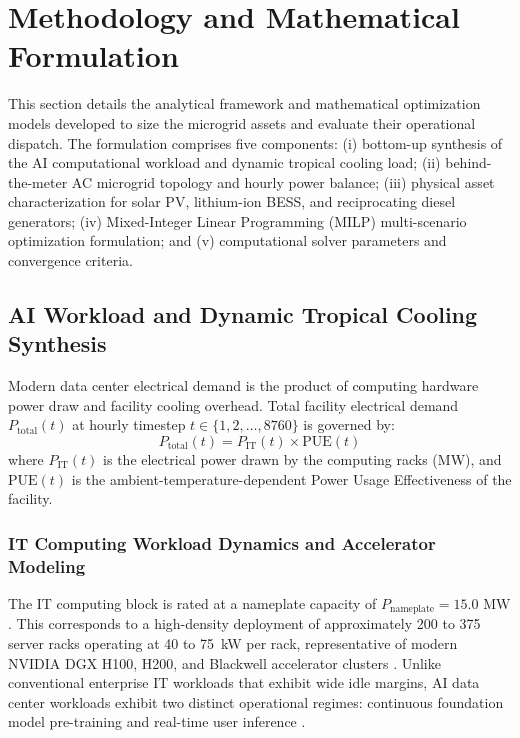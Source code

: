 \documentclass[11pt,a4paper]{article}
\begin{document}
\section{Methodology and Mathematical Formulation}
\label{sec:method}

This section details the analytical framework and mathematical optimization models developed to size the microgrid assets and evaluate their operational dispatch. The formulation comprises five components: (i) bottom-up synthesis of the AI computational workload and dynamic tropical cooling load; (ii) behind-the-meter AC microgrid topology and hourly power balance; (iii) physical asset characterization for solar PV, lithium-ion BESS, and reciprocating diesel generators; (iv) Mixed-Integer Linear Programming (MILP) multi-scenario optimization formulation; and (v) computational solver parameters and convergence criteria.

\subsection{AI Workload and Dynamic Tropical Cooling Synthesis}
\label{sec:load_cooling_model}

Modern data center electrical demand is the product of computing hardware power draw and facility cooling overhead. Total facility electrical demand $P_{\text{total}}(t)$ at hourly timestep $t \in \{1, 2, \dots, 8760\}$ is governed by:
\begin{equation}
    P_{\text{total}}(t) = P_{\text{IT}}(t) \times \text{PUE}(t)
    \label{eq:ptotal}
\end{equation}
where $P_{\text{IT}}(t)$ is the electrical power drawn by the computing racks (MW), and $\text{PUE}(t)$ is the ambient-temperature-dependent Power Usage Effectiveness of the facility.

\subsubsection{IT Computing Workload Dynamics and Accelerator Modeling}
The IT computing block is rated at a nameplate capacity of $P_{\text{nameplate}} = 15.0\text{ MW}$. This corresponds to a high-density deployment of approximately 200 to 375 server racks operating at 40 to 75~kW per rack, representative of modern NVIDIA DGX H100, H200, and Blackwell accelerator clusters \cite{Wu2022, Faiz2024}. Unlike conventional enterprise IT workloads that exhibit wide idle margins, AI data center workloads exhibit two distinct operational regimes: continuous foundation model pre-training and real-time user inference \cite{Faiz2024, Narayanan2021}.
\end{document}
